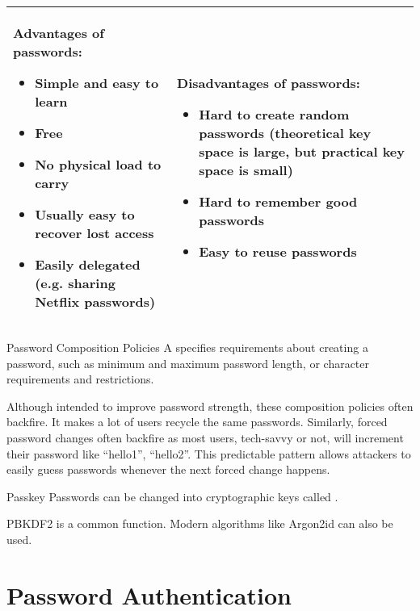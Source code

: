 \documentclass[12pt]{report}
\begin{document}
\begin{tabularx}{\linewidth}{| X | X |}
    \hline
    Advantages of passwords:
    \begin{itemize}[noitemsep,leftmargin=*]
        \item Simple and easy to learn
        \item Free
        \item No physical load to carry
        \item Usually easy to recover lost access
        \item Easily delegated (e.g. sharing Netflix passwords)
    \end{itemize}
    &
    Disadvantages of passwords:
    \begin{itemize}[noitemsep,leftmargin=*]
        \item Hard to create random passwords (theoretical key space is large, but practical key space is small)
        \item Hard to remember good passwords
        \item Easy to reuse passwords
    \end{itemize}
    \\ \hline
\end{tabularx}


\begin{dfnbox}{Password Composition Policies}{}
    A  specifies requirements about creating a password, such as minimum and maximum password length, or character requirements and restrictions.
\end{dfnbox}

Although intended to improve password strength, these composition policies often backfire. It makes a lot of users recycle the same passwords. Similarly, forced password changes often backfire as most users, tech-savvy or not, will increment their password like ``hello1'', ``hello2''. This predictable pattern allows attackers to easily guess passwords whenever the next forced change happens.

\begin{dfnbox}{Passkey}{}
    Passwords can be changed into cryptographic keys called .
\end{dfnbox}

PBKDF2 is a common function. Modern algorithms like Argon2id can also be used.

\section{Password Authentication}
\end{document}
